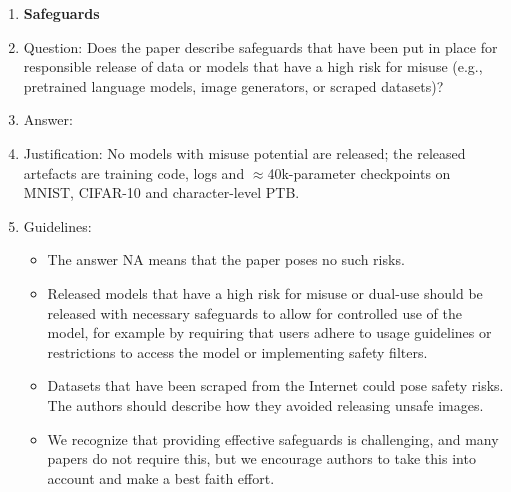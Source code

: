 \documentclass{article}
\begin{document}
\begin{enumerate}
\item {\bf Safeguards}
    \item[] Question: Does the paper describe safeguards that have been put in place for responsible release of data or models that have a high risk for misuse (e.g., pretrained language models, image generators, or scraped datasets)?
    \item[] Answer: \answerNA{}
    \item[] Justification: No models with misuse potential are released; the released artefacts are training code, logs and $\approx$40k-parameter checkpoints on MNIST, CIFAR-10 and character-level PTB.
    \item[] Guidelines:
    \begin{itemize}
        \item The answer NA means that the paper poses no such risks.
        \item Released models that have a high risk for misuse or dual-use should be released with necessary safeguards to allow for controlled use of the model, for example by requiring that users adhere to usage guidelines or restrictions to access the model or implementing safety filters.
        \item Datasets that have been scraped from the Internet could pose safety risks. The authors should describe how they avoided releasing unsafe images.
        \item We recognize that providing effective safeguards is challenging, and many papers do not require this, but we encourage authors to take this into account and make a best faith effort.
    \end{itemize}


\end{enumerate}
\end{document}
